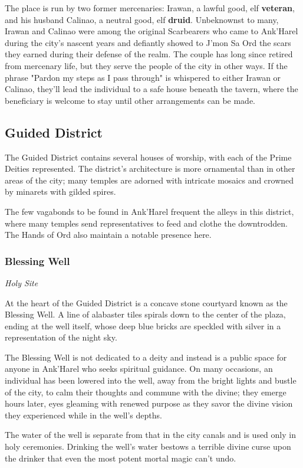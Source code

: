 \documentclass[10pt,a4paper,twoside,bg=print,twocolumn,openany,nodeprecatedcode]{dndbook}
\begin{document}
The place is run by two former mercenaries: Irawan, a lawful good, elf \textbf{veteran}, and his husband Calinao, a neutral good, elf \textbf{druid}. Unbeknownst to many, Irawan and Calinao were among the original Scarbearers who came to Ank'Harel during the city's nascent years and defiantly showed to J'mon Sa Ord the scars they earned during their defense of the realm. The couple has long since retired from mercenary life, but they serve the people of the city in other ways. If the phrase "Pardon my steps as I pass through" is whispered to either Irawan or Calinao, they'll lead the individual to a safe house beneath the tavern, where the beneficiary is welcome to stay until other arrangements can be made.

\subsection{Guided District}
The Guided District contains several houses of worship, with each of the Prime Deities represented. The district's architecture is more ornamental than in other areas of the city; many temples are adorned with intricate mosaics and crowned by minarets with gilded spires.

The few vagabonds to be found in Ank'Harel frequent the alleys in this district, where many temples send representatives to feed and clothe the downtrodden. The Hands of Ord also maintain a notable presence here.

\subsubsection{Blessing Well}
\textit{Holy Site}

At the heart of the Guided District is a concave stone courtyard known as the Blessing Well. A line of alabaster tiles spirals down to the center of the plaza, ending at the well itself, whose deep blue bricks are speckled with silver in a representation of the night sky.

The Blessing Well is not dedicated to a deity and instead is a public space for anyone in Ank'Harel who seeks spiritual guidance. On many occasions, an individual has been lowered into the well, away from the bright lights and bustle of the city, to calm their thoughts and commune with the divine; they emerge hours later, eyes gleaming with renewed purpose as they savor the divine vision they experienced while in the well's depths.

The water of the well is separate from that in the city canals and is used only in holy ceremonies. Drinking the well's water bestows a terrible divine curse upon the drinker that even the most potent mortal magic can't undo.
\end{document}

